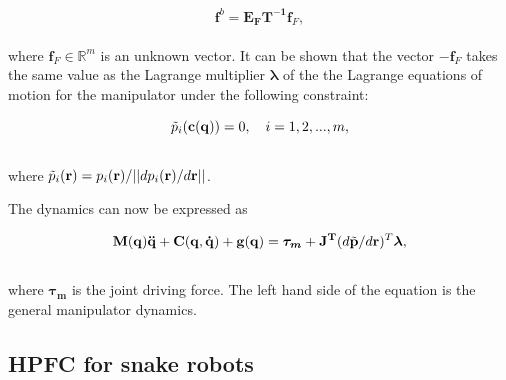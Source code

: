 \begin{equation}
    \mathbf{f}^b = \mathbf{E_F T^{-1}} \mathbf{f}_F,
\end{equation}
\\
where $\mathbf{f}_F \in \mathbb{R}^m$ is an unknown vector. It can be shown that the vector $\mathbf{-f}_F$ takes the same value as the Lagrange multiplier $\boldsymbol{\lambda}$ of the the Lagrange equations of motion for the manipulator under the following constraint:

\begin{equation}
    \Tilde{p}_i(\mathbf{c(q)}) = 0, \quad i = 1, 2, ..., m,
\end{equation}
\\
where $\Tilde{p}_i(\mathbf{r}) = p_i(\mathbf{r})/||dp_i(\mathbf{r})/d\mathbf{r}||$.

The dynamics can now be expressed as

\begin{equation}
    \mathbf{M(q)\ddot{q} + C(q,\dot{q}) + g(q)} = \boldsymbol{\tau_m} + \mathbf{J^T}(d\Tilde{\mathbf{p}}/d\mathbf{r})^T \boldsymbol{\lambda},
\end{equation}
\\
where $\boldsymbol{\tau_m}$ is the joint driving force. The left hand side of the equation is the general manipulator dynamics.



\subsection{HPFC for snake robots}\label{subseq:snakeHPFC}


